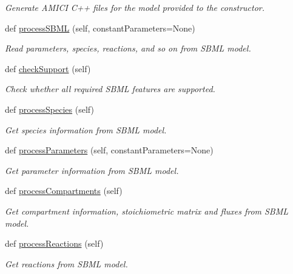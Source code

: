 \begin{DoxyCompactItemize}
\begin{DoxyCompactList}\small\item\em Generate A\+M\+I\+CI C++ files for the model provided to the constructor. \end{DoxyCompactList}\item 
def \mbox{\hyperlink{classamici_1_1sbml__import_1_1_sbml_importer_ac188693ab1d9fc500d55748dbde9bf89}{process\+S\+B\+ML}} (self, constant\+Parameters=None)
\begin{DoxyCompactList}\small\item\em Read parameters, species, reactions, and so on from S\+B\+ML model. \end{DoxyCompactList}\item 
def \mbox{\hyperlink{classamici_1_1sbml__import_1_1_sbml_importer_ae9585f937c02f0618abeb06dd48bcd54}{check\+Support}} (self)
\begin{DoxyCompactList}\small\item\em Check whether all required S\+B\+ML features are supported. \end{DoxyCompactList}\item 
def \mbox{\hyperlink{classamici_1_1sbml__import_1_1_sbml_importer_a4912a89bf86ec8e0c1d9758b8090e327}{process\+Species}} (self)
\begin{DoxyCompactList}\small\item\em Get species information from S\+B\+ML model. \end{DoxyCompactList}\item 
def \mbox{\hyperlink{classamici_1_1sbml__import_1_1_sbml_importer_a26d072114efe1fec695cc4030c64e1ea}{process\+Parameters}} (self, constant\+Parameters=None)
\begin{DoxyCompactList}\small\item\em Get parameter information from S\+B\+ML model. \end{DoxyCompactList}\item 
def \mbox{\hyperlink{classamici_1_1sbml__import_1_1_sbml_importer_a526afc71a857e7fdefb4754fc2f93882}{process\+Compartments}} (self)
\begin{DoxyCompactList}\small\item\em Get compartment information, stoichiometric matrix and fluxes from S\+B\+ML model. \end{DoxyCompactList}\item 
def \mbox{\hyperlink{classamici_1_1sbml__import_1_1_sbml_importer_adbdd8e9af99679633109829d94b3fd3e}{process\+Reactions}} (self)
\begin{DoxyCompactList}\small\item\em Get reactions from S\+B\+ML model. \end{DoxyCompactList}\item 

\end{DoxyCompactItemize}
